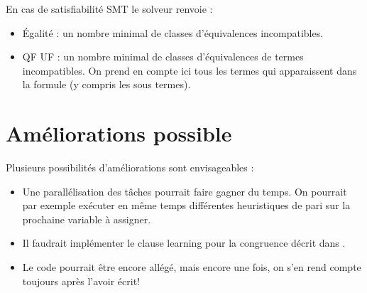 \documentclass{article}
\begin{document}
En cas de satisfiabilité SMT le solveur renvoie : 
\begin{itemize}
\item Égalité : un nombre minimal de classes d'équivalences incompatibles.
\item QF UF : un nombre minimal de classes d'équivalences de termes incompatibles. On prend en compte ici tous les termes qui apparaissent dans la formule (y compris les sous termes).

\end{itemize}

\section{Améliorations possible}
Plusieurs possibilités d'améliorations sont envisageables : 
\begin{itemize}
\item Une parallélisation des tâches pourrait faire gagner du temps. On pourrait par exemple exécuter en même temps différentes heuristiques de pari sur la prochaine variable à assigner.
\item Il faudrait implémenter le clause learning pour la congruence décrit dans \cite{SMT}.
\item Le code pourrait être encore allégé, mais encore une fois, on s'en rend compte toujours après l'avoir écrit!
\end{itemize}



\end{document}
